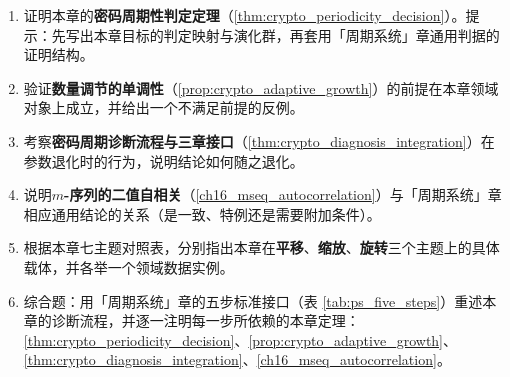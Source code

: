\begin{enumerate}[leftmargin=3em, label=\textbf{题 \arabic*}]
    \item 证明本章的\textbf{密码周期性判定定理}（\ref{thm:crypto_periodicity_decision}）。提示：先写出本章目标的判定映射与演化群，再套用「周期系统」章通用判据的证明结构。

    \item 验证\textbf{数量调节的单调性}（\ref{prop:crypto_adaptive_growth}）的前提在本章领域对象上成立，并给出一个不满足前提的反例。

    \item 考察\textbf{密码周期诊断流程与三章接口}（\ref{thm:crypto_diagnosis_integration}）在参数退化时的行为，说明结论如何随之退化。

    \item 说明\textbf{\(m\)-序列的二值自相关}（\ref{ch16_mseq_autocorrelation}）与「周期系统」章相应通用结论的关系（是一致、特例还是需要附加条件）。

    \item 根据本章七主题对照表，分别指出本章在\textbf{平移}、\textbf{缩放}、\textbf{旋转}三个主题上的具体载体，并各举一个领域数据实例。

    \item 综合题：用「周期系统」章的五步标准接口（表 \ref{tab:ps_five_steps}）重述本章的诊断流程，并逐一注明每一步所依赖的本章定理：\ref{thm:crypto_periodicity_decision}、\ref{prop:crypto_adaptive_growth}、\ref{thm:crypto_diagnosis_integration}、\ref{ch16_mseq_autocorrelation}。
\end{enumerate}


